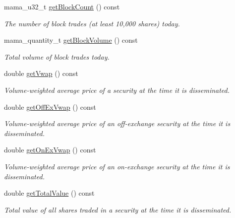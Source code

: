 \begin{CompactItemize}
mama\_\-u32\_\-t \hyperlink{classWombat_1_1MamdaTradeListener_ef024667c725e6c83fc55a2a356899b4}{get\-Block\-Count} () const 
\begin{CompactList}\small\item\em The number of block trades (at least 10,000 shares) today. \item\end{CompactList}\item 
mama\_\-quantity\_\-t \hyperlink{classWombat_1_1MamdaTradeListener_5d1de91179c83b06f897ee66c93174c1}{get\-Block\-Volume} () const 
\begin{CompactList}\small\item\em Total volume of block trades today. \item\end{CompactList}\item 
double \hyperlink{classWombat_1_1MamdaTradeListener_3ca5f333c3c1962ad59dc7f87e6ea053}{get\-Vwap} () const 
\begin{CompactList}\small\item\em Volume-weighted average price of a security at the time it is disseminated. \item\end{CompactList}\item 
double \hyperlink{classWombat_1_1MamdaTradeListener_a7d5a2f66aa6979d4ebd2e8d72621008}{get\-Off\-Ex\-Vwap} () const 
\begin{CompactList}\small\item\em Volume-weighted average price of an off-exchange security at the time it is disseminated. \item\end{CompactList}\item 
double \hyperlink{classWombat_1_1MamdaTradeListener_e0e6940f05e4ba0c6f60c46990d6dbd1}{get\-On\-Ex\-Vwap} () const 
\begin{CompactList}\small\item\em Volume-weighted average price of an on-exchange security at the time it is disseminated. \item\end{CompactList}\item 
double \hyperlink{classWombat_1_1MamdaTradeListener_7b7e5520279a385cde727081db1874d3}{get\-Total\-Value} () const 
\begin{CompactList}\small\item\em Total value of all shares traded in a security at the time it is disseminated. \item\end{CompactList}\item 

\end{CompactItemize}
